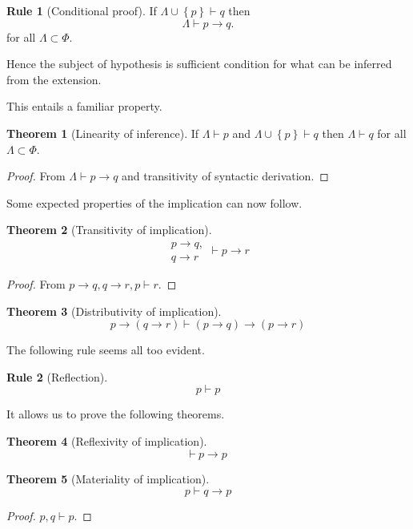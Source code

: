 \documentclass{amsbook}
\newcommand{\setsm}[1]{\left\{#1\right\}}
\newcommand{\infers}{\mathrel\vdash}
\newcommand{\theorem}{\mathord\vdash\medspace}
\newcommand{\then}{\mathrel\rightarrow}
\theoremstyle{definition}
\newtheorem{frule}{Rule}[section]
\newtheorem{thm}{Theorem}[section]
\begin{document}
\begin{frule}[Conditional proof]
    If $\Lambda \cup\setsm p \infers q$ then
    $$\Lambda \infers p \then q.$$
    for all $\Lambda \subset \Phi$.
\end{frule}

Hence the subject of hypothesis is sufficient condition for what can be inferred from the extension.

This entails a familiar property.

\begin{thm}[Linearity of inference]
    If $\Lambda \infers p$ and $\Lambda \cup \setsm p \infers q$ then $\Lambda \infers q$ for all $\Lambda \subset \Phi$.
    \begin{proof}
        From $\Lambda \infers p \then q$ and transitivity of syntactic derivation.
    \end{proof}
\end{thm}

Some expected properties of the implication can now follow.

\begin{thm}[Transitivity of implication]
    $$\begin{aligned}
            p \then q, \\
            q \then r
        \end{aligned} \infers p \then r$$
    \begin{proof}
        From $p \then q, q \then r, p \infers r$.
    \end{proof}
\end{thm}

\begin{thm}[Distributivity of implication]
    $$p \then (q \then r) \infers (p \then q) \then (p \then r)$$
\end{thm}

The following rule seems all too evident.

\begin{frule}[Reflection]
    $$p \infers p$$
\end{frule}

It allows us to prove the following theorems.

\begin{thm}[Reflexivity of implication]
    $$\theorem p \then p$$
\end{thm}

\begin{thm}[Materiality of implication]
    $$p \infers q \then p$$
    \begin{proof}
        $p, q \infers p$.
    \end{proof}
\end{thm}
\end{document}
